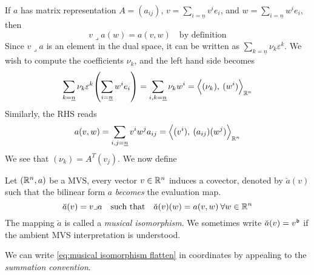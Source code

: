\documentclass[../main-v2-manifolds.tex]{subfiles}
\begin{document}
If $a$ has matrix representation $A = (a_{ij})$, $v = \sum_{i=\underline{n}} v^i e_i$, and $w = \sum_{i=\underline{n}} w^i e_i$, then
\[
    v\lrcorner a(w) = a(v,w)\quad\text{by definition}
\]
Since $v\lrcorner a$ is an element in the dual space, it can be written as $\sum_{k=\underline{n}}\nu_k \varepsilon^k$. We wish to compute the coefficients $\nu_k$, and the left hand side becomes
\[
    \sum_{k=\underline{n}}\nu_k\varepsilon^k\qty(\sum_{i=\underline{n}}w^ie_i) = \sum_{i,k=\underline{n}}\nu_kw^i = \Big\langle {(\nu_k)},\: {(w^i)} \Big\rangle_{{\mathbb{R}^n}}
\]
Similarly, the RHS reads
\[
    a(v,w)=\sum_{i,j=\underline{n}} v^iw^ja_{ij} = \Big\langle {(v^i)},\: {(a_{ij})(w^j)} \Big\rangle_{{\mathbb{R}^n}}
\]
We see that $(\nu_k) = A^T (v_j)$. We now define
\begin{definition}
    Let $({\mathbb{R}^n},a)$ be a MVS, every vector $v\in {\mathbb{R}^n}$ induces a covector, denoted by $\breve{a}(v)$ such that the bilinear form $a$ \emph{becomes} the evaluation map.
    \begin{equation}
        \breve{a}(v) = v\lrcorner a\qqtext{such that}\breve{a}(v)(w) = a(v,w)\:\forall w\in \realn
        \label{eq:musical isomorphism flatten}
    \end{equation}
    The mapping $\breve{a}$ is called a \emph{musical isomorphism}. We sometimes write $\breve{a}(v) = v^{\mathfrak{b}}$ if the ambient MVS interpretation is understood.
\end{definition}
We can write \cref{eq:musical isomorphism flatten} in coordinates by appealing to the \emph{summation convention}. \\
\end{document}
